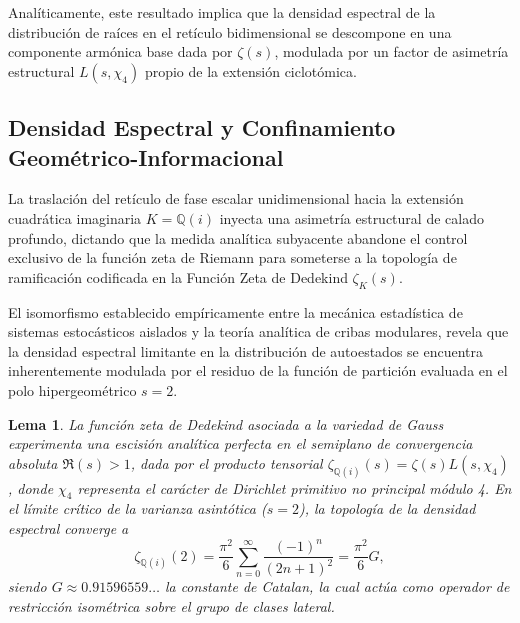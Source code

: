 \documentclass{article}
\numberwithin{equation}{section}
\theoremstyle{plain}
\newtheorem{lema}[teorema]{Lema}
\theoremstyle{definition}
\begin{document}
Analíticamente, este resultado implica que la densidad espectral de la distribución de raíces en el retículo bidimensional se descompone en una componente armónica base dada por $\zeta(s)$, modulada por un factor de asimetría estructural $L(s, \chi_4)$ propio de la extensión ciclotómica.

\subsection{Densidad Espectral y Confinamiento Geométrico-Informacional}

La traslación del retículo de fase escalar unidimensional hacia la extensión cuadrática imaginaria $K = \mathbb{Q}(i)$ inyecta una asimetría estructural de calado profundo, dictando que la medida analítica subyacente abandone el control exclusivo de la función zeta de Riemann para someterse a la topología de ramificación codificada en la Función Zeta de Dedekind $\zeta_K(s)$.

El isomorfismo establecido empíricamente entre la mecánica estadística de sistemas estocásticos aislados y la teoría analítica de cribas modulares, revela que la densidad espectral limitante en la distribución de autoestados se encuentra inherentemente modulada por el residuo de la función de partición evaluada en el polo hipergeométrico $s=2$.

\begin{lema}
La función zeta de Dedekind asociada a la variedad de Gauss experimenta una escisión analítica perfecta en el semiplano de convergencia absoluta $\Re(s) > 1$, dada por el producto tensorial $\zeta_{\mathbb{Q}(i)}(s) = \zeta(s) L(s, \chi_4)$, donde $\chi_4$ representa el carácter de Dirichlet primitivo no principal módulo 4. En el límite crítico de la varianza asintótica ($s=2$), la topología de la densidad espectral converge a
\begin{equation}
    \zeta_{\mathbb{Q}(i)}(2) = \frac{\pi^2}{6} \sum_{n=0}^{\infty} \frac{(-1)^n}{(2n+1)^2} = \frac{\pi^2}{6} G,
\end{equation}
siendo $G \approx 0.91596559\dots$ la constante de Catalan, la cual actúa como operador de restricción isométrica sobre el grupo de clases lateral.
\end{lema}
\end{document}
